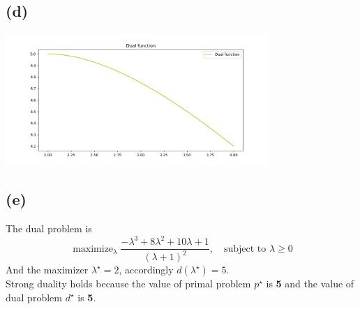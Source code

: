 \documentclass[12pt, a4 paper]{article}
\begin{document}
\begin{framed}
    \subsection{(d)}
    {\centering
    \includegraphics[width=10cm, height=5cm]{7d.jpg}
    }

    \subsection{(e)}
    The dual problem is
    $$
    \mathop{\text{maximize}}_{\lambda} \frac{-\lambda^{3} +
    8\lambda^{2} + 10\lambda + 1}{(\lambda+1)^{2}}, \quad
    \text{subject to } \lambda \geq 0
    $$
    \indent And the maximizer $\lambda^{\star} = 2$, accordingly
    $d(\lambda^{\star}) = 5$.\\
    \indent Strong duality holds because the value of primal problem
    $p^{\star}$ is \textbf{5} and the value of dual problem $d^{\star}$
    is \textbf{5}.
\end{framed}
\end{document}
